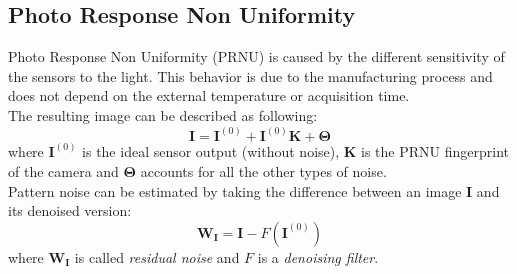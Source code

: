 \documentclass[a4paper, 12pt]{article}
\begin{document}
\subsection*{Photo Response Non Uniformity}
Photo Response Non Uniformity (PRNU) is caused by the different sensitivity of the sensors to the light. This behavior is due to the manufacturing process and does not depend on the external temperature or acquisition time.\\
The resulting image can be described as following:
\begin{equation}
\mathbf{I} = \mathbf{I}^{(0)} + \mathbf{I}^{(0)} \mathbf{K} + \mathbf{\Theta}
\end{equation}
where $\mathbf{I}^{(0)}$ is the ideal sensor output (without noise), $\mathbf{K}$ is the PRNU fingerprint of the camera and $\mathbf{\Theta}$ accounts for all the other types of noise.\\
Pattern noise can be estimated by taking the difference between an image $\mathbf{I}$ and its denoised version:
\begin{equation}\label{eq:imdiff}
\mathbf{W_I} = \mathbf{I}- F\left(\mathbf{I}^{(0)}\right)
\end{equation}
where $\mathbf{W_I}$ is called \textit{residual noise} and $F$ is a \textit{denoising filter}.
\end{document}
